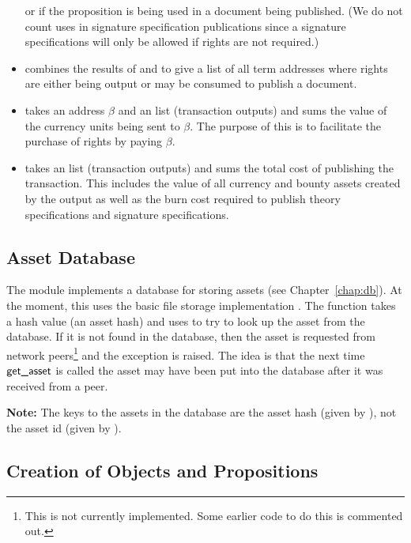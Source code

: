 \begin{itemize}
or if the proposition is being used in a document being published.
(We do not count uses in signature specification publications since
a signature specifications will only be allowed if rights are not required.)
\item {} combines the results of {}
and {} to give a list of all term addresses
where rights are either being output or may be consumed to publish a document.
\item {} takes an address $\beta$
and an {} list (transaction outputs)
and sums the value of the currency units being sent to $\beta$.
The purpose of this is to facilitate the purchase of rights by paying $\beta$.
\item {} takes an {} list (transaction outputs)
and sums the total cost of publishing the transaction.
This includes the value of all currency and bounty assets created by the output
as well as the burn cost required to publish theory specifications
and signature specifications.
\end{itemize}

\subsection{Asset Database}

The module {} implements a database for storing assets
(see Chapter~\ref{chap:db}).
At the moment, this uses the basic file storage implementation {}.
The function {} takes a hash value (an asset hash) and
uses {} to try to look up the asset from the database.
If it is not found in the database,
then the asset is requested from network peers\footnote{This is not currently implemented. Some earlier code to do this is commented out.}
and the exception {} is raised.
The idea is that the next time ${\constr{get\_asset}}$ is
called the asset
may have been put into the database after it was received from a peer.

{\bf{Note:}} The keys to the assets in the database are the asset hash (given by {}), not the asset id (given by {}).

\subsection{Creation of Objects and Propositions}\label{sec:outputcreates}

